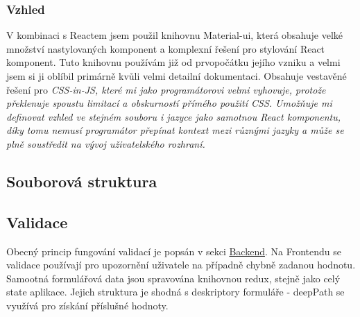 \subsubsection{Vzhled}
V kombinaci s Reactem jsem použil knihovnu Material-ui, která obsahuje velké množství nastylovaných komponent a komplexní řešení pro stylování React komponent. Tuto knihovnu používám již od prvopočátku jejího vzniku a velmi jsem si ji oblíbil primárně kvůli velmi detailní dokumentaci. Obsahuje vestavěné řešení pro \itshape{CSS-in-JS}, které mi jako programátorovi velmi vyhovuje, protože překlenuje spoustu limitací a obskurností přímého použití CSS. Umožňuje mi definovat vzhled ve stejném souboru i jazyce jako samotnou React komponentu, díky tomu nemusí programátor přepínat kontext mezi různými jazyky a může se plně soustředit na vývoj uživatelského rozhraní.

\subsection{Souborová struktura}

\subsection{Validace}
Obecný princip fungování validací je popsán v sekci \hyperref[BE:Validace]{Backend}. Na Frontendu se validace používají pro upozornění uživatele na případně chybně zadanou hodnotu. Samootná formulářová data jsou spravována knihovnou redux, stejně jako celý state aplikace. Jejich struktura je shodná s deskriptory formuláře - deepPath se využívá pro získání příslušné hodnoty.

